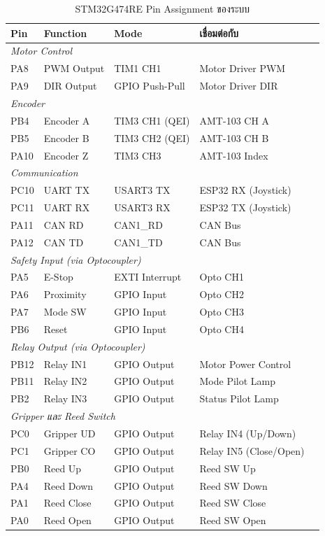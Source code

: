\begin{table}[H]
  \centering
  \caption{STM32G474RE Pin Assignment ของระบบ}
  \label{tab:pin_assignment}
  \begin{tabular}{lllll}
    \toprule
    Pin & Function & Mode & เชื่อมต่อกับ \\
    \midrule
    \multicolumn{4}{l}{\textit{Motor Control}} \\
    PA8 & PWM Output & TIM1 CH1         & Motor Driver PWM \\
    PA9 & DIR Output & GPIO Push-Pull    & Motor Driver DIR \\
    \midrule
    \multicolumn{4}{l}{\textit{Encoder}} \\
    PB4 & Encoder A  & TIM3 CH1 (QEI)   & AMT-103 CH A \\
    PB5 & Encoder B  & TIM3 CH2 (QEI)   & AMT-103 CH B \\
    PA10& Encoder Z  & TIM3 CH3         & AMT-103 Index \\
    \midrule
    \multicolumn{4}{l}{\textit{Communication}} \\
    PC10& UART TX    & USART3 TX        & ESP32 RX (Joystick) \\
    PC11& UART RX    & USART3 RX        & ESP32 TX (Joystick) \\
    PA11& CAN RD     & CAN1\_RD         & CAN Bus \\
    PA12& CAN TD     & CAN1\_TD         & CAN Bus \\
    \midrule
    \multicolumn{4}{l}{\textit{Safety Input (via Optocoupler)}} \\
    PA5 & E-Stop     & EXTI Interrupt   & Opto CH1 \\
    PA6 & Proximity  & GPIO Input       & Opto CH2 \\
    PA7 & Mode SW    & GPIO Input       & Opto CH3 \\
    PB6 & Reset      & GPIO Input       & Opto CH4 \\
    \midrule
    \multicolumn{4}{l}{\textit{Relay Output (via Optocoupler)}} \\
    PB12& Relay IN1  & GPIO Output      & Motor Power Control \\
    PB11& Relay IN2  & GPIO Output      & Mode Pilot Lamp \\
    PB2 & Relay IN3  & GPIO Output      & Status Pilot Lamp \\
    \midrule
    \multicolumn{4}{l}{\textit{Gripper และ Reed Switch}} \\
    PC0 & Gripper UD & GPIO Output      & Relay IN4 (Up/Down) \\
    PC1 & Gripper CO & GPIO Output      & Relay IN5 (Close/Open) \\
    PB0 & Reed Up    & GPIO Output      & Reed SW Up \\
    PA4 & Reed Down  & GPIO Output      & Reed SW Down \\
    PA1 & Reed Close & GPIO Output      & Reed SW Close \\
    PA0 & Reed Open  & GPIO Output      & Reed SW Open \\
    \bottomrule
  \end{tabular}
\end{table}

